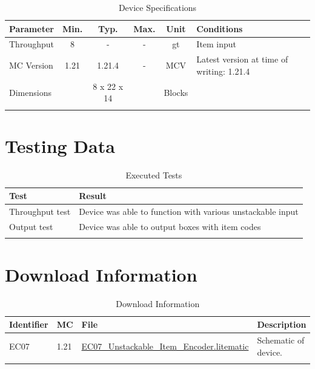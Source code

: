 \documentclass[10pt]{datasheet}
\begin{document}
\begin{table}[H]
    \caption{Device Specifications}
    \begin{tabularx}{\textwidth}{l | c c c | c | X}
        \thickhline
        \textbf{Parameter} & \textbf{Min.} & \textbf{Typ.} & \textbf{Max.} &
        \textbf{Unit} & \textbf{Conditions} \\
        \hline
        Throughput  & 8 & - & - & gt & Item input \\
        \hline
        MC Version & 1.21 & 1.21.4 & - & MCV & Latest version at time of writing: 1.21.4\\
        \hline
        Dimensions & & 8 x 22 x 14 & & Blocks & \\
        \thickhline
\end{tabularx}
\end{table}
\section{Testing Data}
\begin{table}[H]
\caption{Executed Tests}
\begin{tabularx}{\textwidth}{l | X}
    \thickhline
    \textbf{Test} & \textbf{Result} \\
    \hline
    Throughput test & Device was able to function with various unstackable input \\
    \hline
    Output test & Device was able to output boxes with item codes \\
    \thickhline
\end{tabularx}
\end{table}

\section{Download Information}
\begin{table}[H]
    \caption{Download Information}
    \begin{tabularx}{\textwidth}{l | l | l | X}
        \thickhline
        \textbf{Identifier} & \textbf{MC} & \textbf{File} & \textbf{Description} \\
        \hline
        EC07 & 1.21 & \href{https://github.com/Soontech-Annals/Archive/blob/2b73adfd252c5e2cf9d202454dbef78a586bc482/Archive/encoders/EC07\%20Unstackable\%20Item\%20Encoder/EC07\_Unstackable\_Item\_Encoder.litematic?raw=1}{EC07\_Unstackable\_Item\_Encoder.litematic} & Schematic of device. \\
        \hline
        \thickhline
    \end{tabularx}
\end{table}
\end{document}

